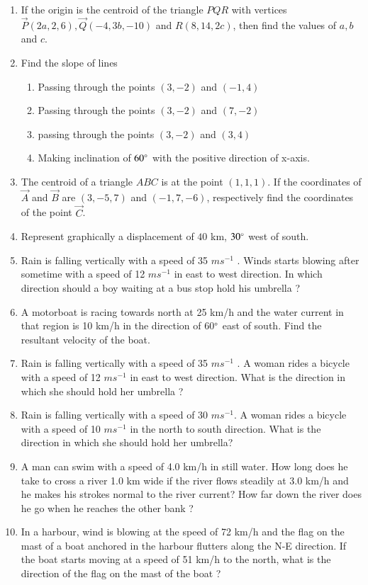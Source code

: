\begin{enumerate}[label=\thesubsection.\arabic*, ref=\thesubsection.\theenumi]
\item If the origin is the centroid of the triangle $PQR$ with vertices $\vec{P}(2a, 2, 6),  \vec{Q}(-4, 3b, -10)$ and $R(8, 14, 2c)$,  then find the values of $a,  b$ and $c$.
\item Find the slope of lines
\begin{enumerate}
\item  Passing through the points $(3, -2)$ and $(-1, 4)$
\item  Passing through the points $(3, -2)$ and $(7, -2)$
\item  passing through the points $(3, -2)$ and $(3, 4)$	
\item  Making inclination of $60\degree$ with the positive direction of x-axis.
\end{enumerate}
\item The centroid of a triangle $ABC$ is at the point $(1, 1, 1)$. If the coordinates of $\vec{A}$ and $\vec{B}$ are $(3, -5, 7)$ and $(-1, 7, -6)$,  respectively find the coordinates of the point $\vec{C}$.
\item Represent graphically a displacement of $40$ km,  $30\degree$ west of south.
	\item Rain is falling vertically with a speed of 35 $m s^{-1}$
. Winds starts blowing after sometime with a speed of 12 $m s^{-1}$ in
east to west direction. In which direction should a boy waiting at a bus stop hold his umbrella ?
%
\item A motorboat is racing towards north at 25 km/h and the water current in that region is 10 km/h in the direction of 60$\degree$ east of south. Find the resultant velocity of the boat.
\item Rain is falling vertically with a speed of 35 $m s^{-1}$
. A woman rides a bicycle with a speed of 12 $ms^{-1}$ in east to west
direction. What is the direction in which she should hold her umbrella ?
\item Rain is falling vertically with a speed of 30 $m s^{-1}$. A woman rides a bicycle with a speed  of 10 $m s^{-1}$ in the north to south direction. What is the direction in which she should
hold her umbrella?
\item A man can swim with a speed of 4.0 km/h in still water. How long does he take to cross a river 1.0 km wide if the river flows steadily at 3.0 km/h and he makes his strokes normal to the river current? How far down the river does he go when he reaches the other bank ?
\item In a harbour,  wind is blowing at the speed of 72 km/h and the flag on the mast of a boat anchored in the harbour flutters along the N-E direction. If the boat starts moving at a speed of 51 km/h to the north,  what is the direction of the flag on the mast of the boat ?

\end{enumerate}
